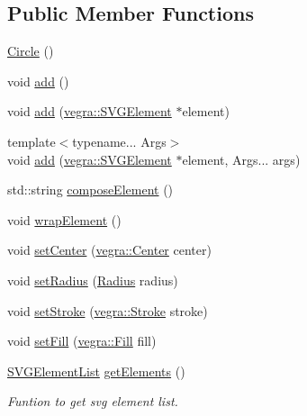 \subsection*{Public Member Functions}
\begin{DoxyCompactItemize}
\item 
\mbox{\hyperlink{structvegra_1_1Circle_a30b817f23ffab115eda5d1d1a36d0a9b}{Circle}} ()
\item 
void \mbox{\hyperlink{structvegra_1_1Circle_adcfee7bc2183fb2173bc9a27659457bf}{add}} ()
\item 
void \mbox{\hyperlink{structvegra_1_1Circle_acf78b38e6f133931c4963652db3b382b}{add}} (\mbox{\hyperlink{structvegra_1_1SVGElement}{vegra\+::\+S\+V\+G\+Element}} $\ast$element)
\item 
{\footnotesize template$<$typename... Args$>$ }\\void \mbox{\hyperlink{structvegra_1_1Circle_a5e6f8b011ad3083ef2f3b8a731f96c7d}{add}} (\mbox{\hyperlink{structvegra_1_1SVGElement}{vegra\+::\+S\+V\+G\+Element}} $\ast$element, Args... args)
\item 
std\+::string \mbox{\hyperlink{structvegra_1_1Circle_ad32a663886487547c33ebeef6449c19a}{compose\+Element}} ()
\item 
void \mbox{\hyperlink{structvegra_1_1Circle_a67bfa48e7697a6ee3e7c79fed1129a3c}{wrap\+Element}} ()
\item 
void \mbox{\hyperlink{structvegra_1_1Circle_a25017785ce433a356b6b15b5d2d36060}{set\+Center}} (\mbox{\hyperlink{structvegra_1_1Center}{vegra\+::\+Center}} center)
\item 
void \mbox{\hyperlink{structvegra_1_1Circle_ac6f88039c6d3f666a8156876455854d0}{set\+Radius}} (\mbox{\hyperlink{structvegra_1_1Radius}{Radius}} radius)
\item 
void \mbox{\hyperlink{structvegra_1_1Circle_a85efa989ca99a6639fe24918b19c78b3}{set\+Stroke}} (\mbox{\hyperlink{structvegra_1_1Stroke}{vegra\+::\+Stroke}} stroke)
\item 
void \mbox{\hyperlink{structvegra_1_1Circle_a3a5d0f5879eb8ecba92782670dc386b4}{set\+Fill}} (\mbox{\hyperlink{structvegra_1_1Fill}{vegra\+::\+Fill}} fill)
\item 
\mbox{\hyperlink{namespacevegra_a2722f5eceb74f65746a02a57b71d125e}{S\+V\+G\+Element\+List}} \mbox{\hyperlink{structvegra_1_1Circle_a657b1849c50925b9f38e1f13ac0f4cd5}{get\+Elements}} ()
\begin{DoxyCompactList}\small\item\em Funtion to get svg element list. \end{DoxyCompactList}\item 

\end{DoxyCompactItemize}
